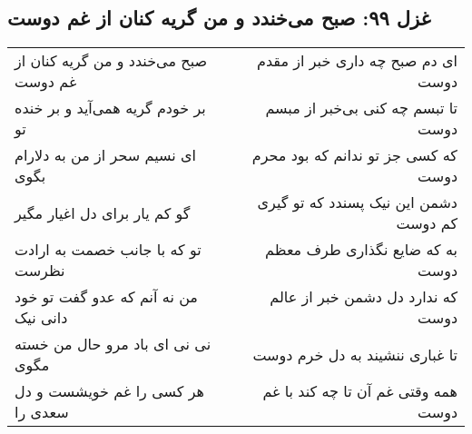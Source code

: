 \begin{center}
\section*{غزل ۹۹: صبح می‌خندد و من گریه کنان از غم دوست}
\label{sec:099}
\begin{longtable}{l p{0.5cm} r}
صبح می‌خندد و من گریه کنان از غم دوست
&&
ای دم صبح چه داری خبر از مقدم دوست
\\
بر خودم گریه همی‌آید و بر خنده تو
&&
تا تبسم چه کنی بی‌خبر از مبسم دوست
\\
ای نسیم سحر از من به دلارام بگوی
&&
که کسی جز تو ندانم که بود محرم دوست
\\
گو کم یار برای دل اغیار مگیر
&&
دشمن این نیک پسندد که تو گیری کم دوست
\\
تو که با جانب خصمت به ارادت نظرست
&&
به که ضایع نگذاری طرف معظم دوست
\\
من نه آنم که عدو گفت تو خود دانی نیک
&&
که ندارد دل دشمن خبر از عالم دوست
\\
نی نی ای باد مرو حال من خسته مگوی
&&
تا غباری ننشیند به دل خرم دوست
\\
هر کسی را غم خویشست و دل سعدی را
&&
همه وقتی غم آن تا چه کند با غم دوست
\\
\end{longtable}
\end{center}
